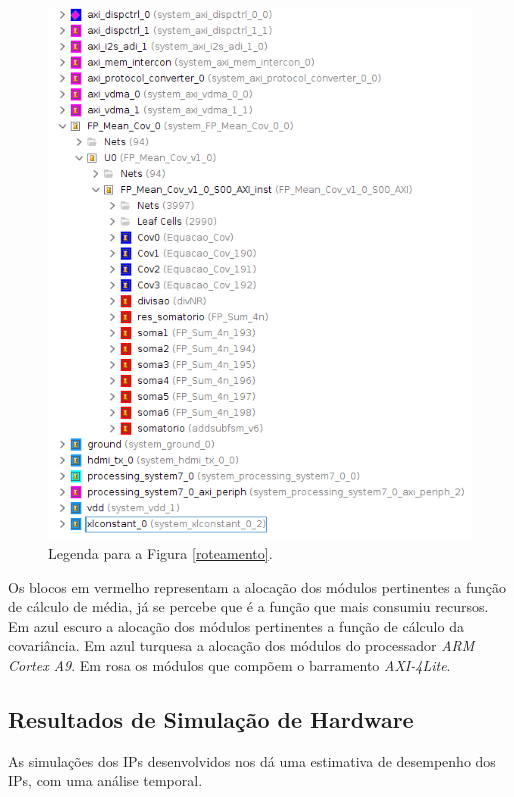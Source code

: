 \begin{figure}[!h]
	\centering
	\includegraphics[keepaspectratio=true,scale=0.35]{figuras/legenda_roteamento.PNG}
	\caption{Legenda para a Figura \ref{roteamento}.}
	\label{legenda_rot}
\end{figure}

Os blocos em vermelho representam a alocação dos módulos pertinentes a função de cálculo de média, já se percebe que é a função que mais consumiu recursos. Em azul escuro a alocação dos módulos pertinentes a função de cálculo da covariância. Em azul turquesa a alocação dos módulos do processador \textit{ARM Cortex A9}. 
Em rosa os módulos que compõem o barramento \textit{AXI-4Lite}.

\subsection{Resultados de Simulação de Hardware}
As simulações dos IPs desenvolvidos nos dá uma estimativa de desempenho dos IPs, com uma análise temporal. 


